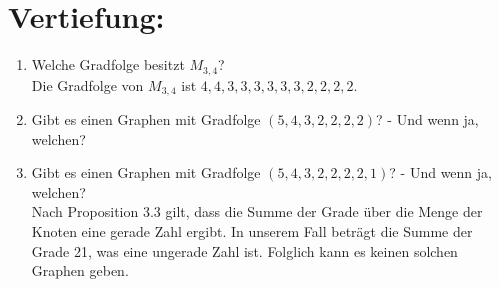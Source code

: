 

\usepackage{tikz} 


    \maketitle
    \section*{Vertiefung:}
    \begin{enumerate}[label=(\alph*)]
        \item Welche Gradfolge besitzt $M_{3,4}$?\\
        Die Gradfolge von $M_{3,4}$ ist $4,4,3,3,3,3,3,3,2,2,2,2$.

        \item Gibt es einen Graphen mit Gradfolge $(5, 4, 3, 2, 2, 2, 2)$? - Und wenn ja, welchen?\\

        \item Gibt es einen Graphen mit Gradfolge $(5, 4, 3, 2, 2, 2, 2, 1)$? - Und wenn ja, welchen?\\
        Nach Proposition 3.3 gilt, dass die Summe der Grade über die Menge der Knoten eine gerade Zahl ergibt. 
        In unserem Fall beträgt die Summe der Grade 21, was eine ungerade Zahl ist. Folglich kann es 
        keinen solchen Graphen geben. 


\end{enumerate}
